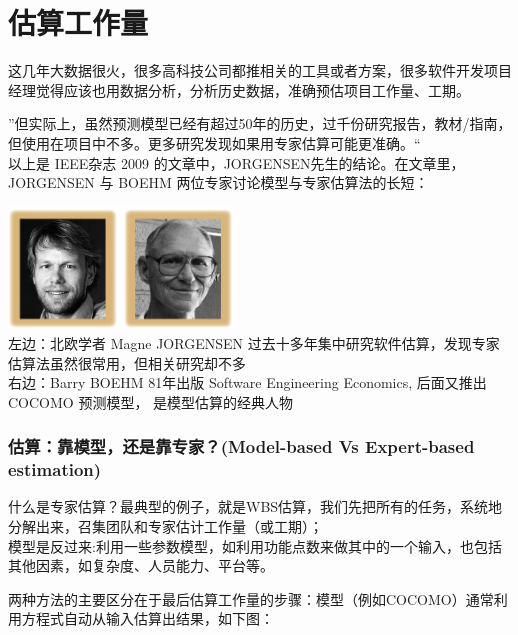 \chapter{估算工作量} %

这几年大数据很火，很多高科技公司都推相关的工具或者方案，很多软件开发项目经理觉得应该也用数据分析，分析历史数据，准确预估项目工作量、工期。

''但实际上，虽然预测模型已经有超过50年的历史，过千份研究报告，教材/指南，但使用在项目中不多。更多研究发现如果用专家估算可能更准确。``\\
以上是 IEEE杂志 2009 的文章中，JORGENSEN先生的结论。在文章里，JORGENSEN
与 BOEHM 两位专家讨论模型与专家估算法的长短：


\includegraphics[width=6cm]{估算专家.png}\\

左边：北欧学者 Magne JORGENSEN
过去十多年集中研究软件估算，发现专家估算法虽然很常用，但相关研究却不多\\
右边：Barry BOEHM 81年出版 Software Engineering Economics, 后面又推出
COCOMO 预测模型， 是模型估算的经典人物

\hypertarget{ux4f30ux7b97ux9760ux6a21ux578bux8fd8ux662fux9760ux4e13ux5bb6model-based-vs-expert-based-estimation}{%
\subsection{估算：靠模型，还是靠专家？(Model-based Vs Expert-based
estimation)}\label{ux4f30ux7b97ux9760ux6a21ux578bux8fd8ux662fux9760ux4e13ux5bb6model-based-vs-expert-based-estimation}}

什么是专家估算？最典型的例子，就是WBS估算，我们先把所有的任务，系统地分解出来，召集团队和专家估计工作量（或工期）；\\
模型是反过来:利用一些参数模型，如利用功能点数来做其中的一个输入，也包括其他因素，如复杂度、人员能力、平台等。

两种方法的主要区分在于最后估算工作量的步骤：模型（例如COCOMO）通常利用方程式自动从输入估算出结果，如下图：

